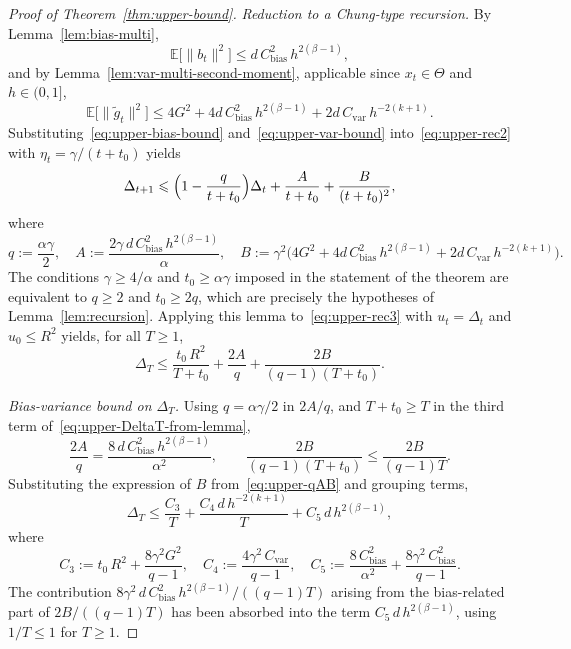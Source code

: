 \documentclass{article}
\renewcommand{\leq}{\leqslant}
\renewcommand{\geq}{\geqslant}
\theoremstyle{definition}
\begin{document}
\begin{proof}[Proof of Theorem~\ref{thm:upper-bound}]
\medskip
\noindent\textit{Reduction to a Chung-type recursion.}
By Lemma~\ref{lem:bias-multi}, 
\begin{equation}
\label{eq:upper-bias-bound}
\mathbb{E}\bigl[\|b_t\|^2\bigr]
\leq d\,C_{\mathrm{bias}}^2\,h^{2(\beta-1)},
\end{equation}
and by Lemma~\ref{lem:var-multi-second-moment}, applicable since 
$x_t\in\Theta$ and $h\in(0,1]$,
\begin{equation}
\label{eq:upper-var-bound}
\mathbb{E}\bigl[\|\tilde{g}_t\|^2\bigr]
\leq 4G^2+4d\,C_{\mathrm{bias}}^2\,h^{2(\beta-1)}
+2d\,C_{\mathrm{var}}\,h^{-2(k+1)}.
\end{equation}
Substituting~\eqref{eq:upper-bias-bound} 
and~\eqref{eq:upper-var-bound} into~\eqref{eq:upper-rec2} with 
$\eta_t=\gamma/(t+t_0)$ yields
\begin{equation}
\label{eq:upper-rec3}
\Delta_{t+1}\leq\Bigl(1-\frac{q}{t+t_0}\Bigr)\Delta_t
+\frac{A}{t+t_0}+\frac{B}{(t+t_0)^2},
\end{equation}
where 
\begin{equation}
\label{eq:upper-qAB}
q:=\frac{\alpha\gamma}{2},\quad
A:=\frac{2\gamma\,d\,C_{\mathrm{bias}}^2\,h^{2(\beta-1)}}{\alpha},\quad
B:=\gamma^2\bigl(4G^2+4d\,C_{\mathrm{bias}}^2\,h^{2(\beta-1)}
+2d\,C_{\mathrm{var}}\,h^{-2(k+1)}\bigr).
\end{equation}
The conditions $\gamma\geq 4/\alpha$ and $t_0\geq\alpha\gamma$ 
imposed in the statement of the theorem are equivalent to $q\geq 2$ 
and $t_0\geq 2q$, which are precisely the hypotheses of 
Lemma~\ref{lem:recursion}. Applying this lemma 
to~\eqref{eq:upper-rec3} with $u_t=\Delta_t$ and $u_0\leq R^2$ 
yields, for all $T\geq 1$,
\begin{equation}
\label{eq:upper-DeltaT-from-lemma}
\Delta_T\leq\frac{t_0\,R^2}{T+t_0}
+\frac{2A}{q}
+\frac{2B}{(q-1)(T+t_0)}.
\end{equation}

\medskip
\noindent\textit{Bias-variance bound on $\Delta_T$.}
Using $q=\alpha\gamma/2$ in $2A/q$, and $T+t_0\geq T$ in the third 
term of~\eqref{eq:upper-DeltaT-from-lemma},
\[
\frac{2A}{q}=\frac{8\,d\,C_{\mathrm{bias}}^2\,h^{2(\beta-1)}}{\alpha^2},
\qquad
\frac{2B}{(q-1)(T+t_0)}\leq\frac{2B}{(q-1)T}.
\]
Substituting the expression of $B$ from~\eqref{eq:upper-qAB} and 
grouping terms,
\begin{equation}
\label{eq:upper-DeltaT-grouped}
\Delta_T\leq\frac{C_3}{T}+\frac{C_4\,d\,h^{-2(k+1)}}{T}
+C_5\,d\,h^{2(\beta-1)},
\end{equation}
where 
\begin{equation}
\label{eq:upper-C345}
C_3:=t_0\,R^2+\frac{8\gamma^2 G^2}{q-1},\quad
C_4:=\frac{4\gamma^2\,C_{\mathrm{var}}}{q-1},\quad
C_5:=\frac{8\,C_{\mathrm{bias}}^2}{\alpha^2}
+\frac{8\gamma^2\,C_{\mathrm{bias}}^2}{q-1}.
\end{equation}
The contribution 
$8\gamma^2\,d\,C_{\mathrm{bias}}^2\,h^{2(\beta-1)}/((q-1)T)$ 
arising from the bias-related part of 
$2B/((q-1)T)$ has been absorbed into the term 
$C_5\,d\,h^{2(\beta-1)}$, using $1/T\leq 1$ for $T\geq 1$.


\end{proof}
\end{document}
